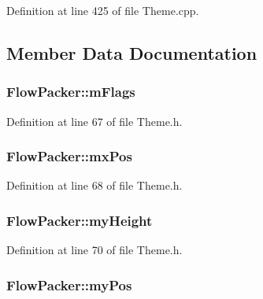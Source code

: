 Definition at line 425 of file Theme.\+cpp.



\subsection{Member Data Documentation}
\subsubsection[{\texorpdfstring{m\+Flags}{mFlags}}]{ Flow\+Packer\+::m\+Flags}\hypertarget{class_flow_packer_a9493a5a69899aacf1ff938e6c08f691a}{}\label{class_flow_packer_a9493a5a69899aacf1ff938e6c08f691a}


Definition at line 67 of file Theme.\+h.

\subsubsection[{\texorpdfstring{mx\+Pos}{mxPos}}]{ Flow\+Packer\+::mx\+Pos}\hypertarget{class_flow_packer_adf99dc5720453412a1bb453839ddf2c1}{}\label{class_flow_packer_adf99dc5720453412a1bb453839ddf2c1}


Definition at line 68 of file Theme.\+h.

\subsubsection[{\texorpdfstring{my\+Height}{myHeight}}]{ Flow\+Packer\+::my\+Height}\hypertarget{class_flow_packer_a005fe3871a5ef449ac07d434c3acbb12}{}\label{class_flow_packer_a005fe3871a5ef449ac07d434c3acbb12}


Definition at line 70 of file Theme.\+h.

\subsubsection[{\texorpdfstring{my\+Pos}{myPos}}]{ Flow\+Packer\+::my\+Pos}\hypertarget{class_flow_packer_afd5c943a8a3b9ce24ee228aa7eea7aaa}{}\label{class_flow_packer_afd5c943a8a3b9ce24ee228aa7eea7aaa}


